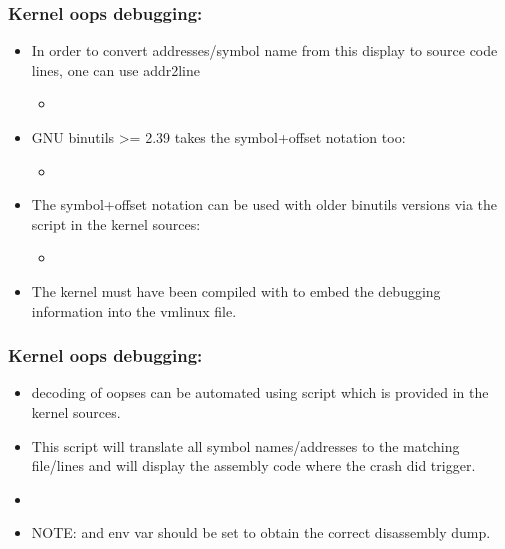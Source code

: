 \begin{frame}
  \frametitle{Kernel oops debugging: }
  \begin{itemize}
    \item In order to convert addresses/symbol name from this display to source
      code lines, one can use addr2line
    \begin{itemize}
      \item {}
    \end{itemize}
    \item GNU binutils >= 2.39 takes the symbol+offset notation too:
    \begin{itemize}
      \item {}
    \end{itemize}
    \item The symbol+offset notation can be used with older binutils
      versions via the  script in the kernel sources:
    \begin{itemize}
      \item {}
    \end{itemize}
    \item The kernel must have been compiled with
       to embed the debugging information into
      the vmlinux file.
  \end{itemize}
\end{frame}

\begin{frame}
  \frametitle{Kernel oops debugging: }
  \begin{itemize}
    \item {} decoding of oopses can be automated using
       script which is provided in the kernel
      sources.
    \item This script will translate all symbol names/addresses to the matching
      file/lines and will display the assembly code where the crash did trigger.
    \item {} \\

    \item NOTE:  and  env var should be set to
      obtain the correct disassembly dump.
  \end{itemize}
\end{frame}

